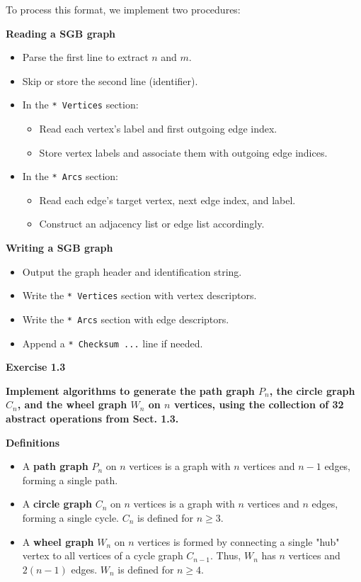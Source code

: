 \documentclass{article}
\begin{document}
To process this format, we implement two procedures:

\textbf{Reading a SGB graph}
\begin{itemize}
    \item Parse the first line to extract $n$ and $m$.
    \item Skip or store the second line (identifier).
    \item In the \texttt{* Vertices} section:
    \begin{itemize}
        \item Read each vertex’s label and first outgoing edge index.
        \item Store vertex labels and associate them with outgoing edge indices.
    \end{itemize}
    \item In the \texttt{* Arcs} section:
    \begin{itemize}
        \item Read each edge’s target vertex, next edge index, and label.
        \item Construct an adjacency list or edge list accordingly.
    \end{itemize}
\end{itemize}

\textbf{Writing a SGB graph}
\begin{itemize}
    \item Output the graph header and identification string.
    \item Write the \texttt{* Vertices} section with vertex descriptors.
    \item Write the \texttt{* Arcs} section with edge descriptors.
    \item Append a \texttt{* Checksum ...} line if needed.
\end{itemize}

\textbf{Exercise 1.3}

\textbf{Implement algorithms to generate the path graph $P_n$, the circle graph $C_n$, and the wheel graph $W_n$ on $n$ vertices, using the collection of 32 abstract operations from Sect. 1.3.}

\textbf{Definitions}

\begin{itemize}
    \item A \textbf{path graph} $P_n$ on $n$ vertices is a graph with $n$ vertices and $n-1$ edges, forming a single path.
    \item A \textbf{circle graph} $C_n$ on $n$ vertices is a graph with $n$ vertices and $n$ edges, forming a single cycle. $C_n$ is defined for $n \ge 3$.
    \item A \textbf{wheel graph} $W_n$ on $n$ vertices is formed by connecting a single "hub" vertex to all vertices of a cycle graph $C_{n-1}$. Thus, $W_n$ has $n$ vertices and $2(n-1)$ edges. $W_n$ is defined for $n \ge 4$.
\end{itemize}
\end{document}
